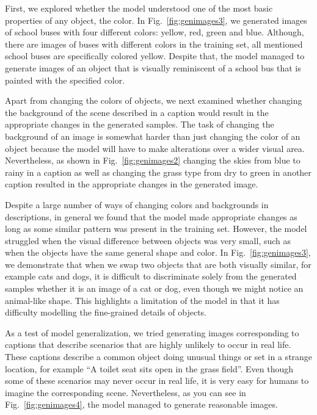 \documentclass{article} %
\newcommand{\Figref}[1]{Fig.~\ref{#1}}
\begin{document}
First, we explored whether the model understood one of the most basic properties of any object, the color. In \Figref{fig:genimages3}, we generated images of school buses with four different colors: yellow, red, green and blue. Although, there are images of buses with different colors in the training set, all mentioned school buses are specifically colored yellow. Despite that, the model managed to generate images of an object that is visually reminiscent of a school bus that is painted with the specified color.

Apart from changing the colors of objects, we next examined whether changing the background of the scene described in a caption would result in the appropriate changes in the generated samples. The task of changing the background of an image is somewhat harder than just changing the color of an object because the model will have to make alterations over a wider visual area. Nevertheless, as shown in \Figref{fig:genimages2} changing the skies from blue to rainy in a caption as well as changing the grass type from dry to green in another caption resulted in the appropriate changes in the generated image.

Despite a large number of ways of changing colors and backgrounds in descriptions, in general we found that the model made appropriate changes as long as some similar pattern was present in the training set. However, the model struggled when the visual difference between objects was very small, such as when the objects have the same general shape and color. In \Figref{fig:genimages3}, we demonstrate that when we swap two objects that are both visually similar, for example cats and dogs, it is difficult to discriminate solely from the generated samples whether it is an image of a cat or dog, even though we might notice an animal-like shape. This highlights a limitation of the model in that it has difficulty modelling the fine-grained details of objects.

As a test of model generalization, we tried generating images corresponding to captions that describe scenarios that are highly unlikely to occur in real life. These captions describe a common object doing unusual things 
or set in a strange location, for example ``A toilet seat sits open in the grass field''.
Even though some of these scenarios may never occur in real life, it is very easy for humans to imagine the corresponding scene. Nevertheless, as you can see in \Figref{fig:genimages4}, the model managed to generate reasonable images.  
\end{document}
